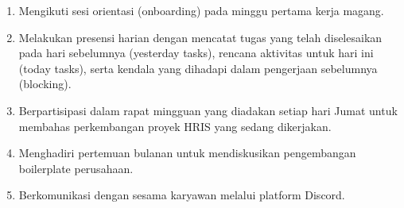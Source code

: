 \begin{enumerate}
    \item Mengikuti sesi orientasi (onboarding) pada minggu pertama kerja magang.
    \item Melakukan presensi harian dengan mencatat tugas yang telah diselesaikan 
    pada hari sebelumnya (yesterday tasks), rencana aktivitas untuk hari ini 
    (today tasks), serta kendala yang dihadapi dalam pengerjaan sebelumnya (blocking).
    \item Berpartisipasi dalam rapat mingguan yang diadakan setiap hari Jumat 
    untuk membahas perkembangan proyek HRIS yang sedang dikerjakan.
    \item Menghadiri pertemuan bulanan untuk mendiskusikan pengembangan 
    boilerplate perusahaan.
    \item Berkomunikasi dengan sesama karyawan melalui platform Discord.
\end{enumerate}
